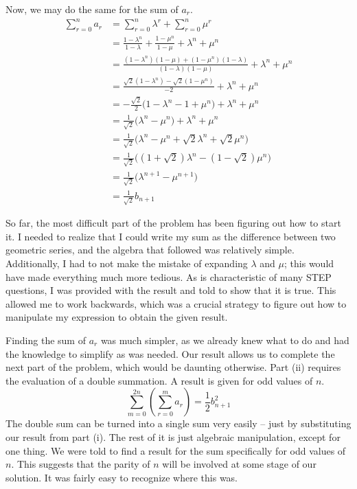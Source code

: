 \documentclass[a4paper]{article}
\begin{document}
Now, we may do the same for the sum of $a_r$.
\begin{align*}
    \sum_{r=0}^{n} a_r & = \sum_{r=0}^{n} \lambda^r + \sum_{r=0}^{n} \mu^r                                                \\
                       & = \frac{1-\lambda^n}{1-\lambda} + \frac{1-\mu^n}{1-\mu} + \lambda^n + \mu^n                      \\
                       & = \frac{(1-\lambda^n)(1-\mu) + (1-\mu^n)(1-\lambda)}{(1-\lambda)(1-\mu)} + \lambda^n + \mu^n     \\
                       & = \frac{\sqrt{2}(1-\lambda^n) - \sqrt{2}(1-\mu^n)}{-2} + \lambda^n + \mu^n                       \\
                       & = -\frac{\sqrt{2}}{2}\bigg(1-\lambda^n - 1 + \mu^n\bigg) + \lambda^n + \mu^n                     \\
                       & = \frac{1}{\sqrt{2}}\bigg(\lambda^n - \mu^n\bigg) + \lambda^n + \mu^n                            \\
                       & = \frac{1}{\sqrt{2}}\bigg(\lambda^n - \mu^n + \sqrt{2}\lambda^n + \sqrt{2}\mu^n \bigg)           \\
                       & = \frac{1}{\sqrt{2}}\bigg(\left(1+\sqrt{2}\right)\lambda^n - \left(1-\sqrt{2}\right)\mu^n \bigg) \\
                       & = \frac{1}{\sqrt{2}}\bigg(\lambda^{n+1} - \mu^{n+1} \bigg)                                       \\
                       & = \frac{1}{\sqrt{2}}b_{n+1}
\end{align*}

So far, the most difficult part of the problem has been figuring out how to start it.
I needed to realize that I could write my sum as the difference between two geometric series, and the algebra that followed was relatively simple.
Additionally, I had to not make the mistake of expanding $\lambda$ and $\mu$; this would have made everything much more tedious.
As is characteristic of many STEP questions, I was provided with the result and told to show that it is true.
This allowed me to work backwards, which was a crucial strategy to figure out how to manipulate my expression to obtain the given result.

Finding the sum of $a_r$ was much simpler, as we already knew what to do and had the knowledge to simplify as was needed.
Our result allows us to complete the next part of the problem, which would be daunting otherwise.
Part (ii) requires the evaluation of a double summation.
A result is given for odd values of $n$.
\begin{equation}
    \sum_{m=0}^{2n} \left(\sum_{r=0}^{m} a_r\right) = \frac{1}{2} b^2_{n+1}
\end{equation}
The double sum can be turned into a single sum very easily -- just by substituting our result from part (i).
The rest of it is just algebraic manipulation, except for one thing.
We were told to find a result for the sum specifically for odd values of $n$.
This suggests that the parity of $n$ will be involved at some stage of our solution.
It was fairly easy to recognize where this was.
\end{document}
